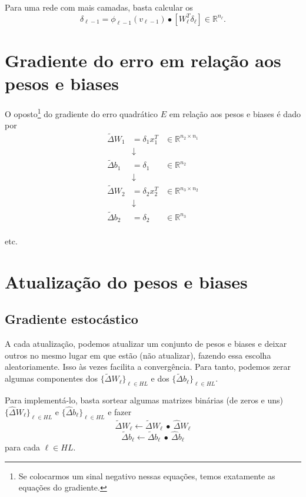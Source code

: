 \documentclass[12pt,a4paper]{article}
\def\RR{\mathbb{R}}
\begin{document}
Para uma rede com mais camadas, basta calcular os 
\[
\delta_{\ell-1}=\phi_{\ell-1}(v_{\ell-1}) \bullet [W_\ell ^T\delta_ \ell]\in\RR^{n_\ell}.
\]


\section{Gradiente do erro em relação aos pesos e biases}
O oposto\footnote{Se colocarmos um sinal negativo nessas equações, temos exatamente as equações do gradiente.} do gradiente do erro quadrático $E$ em relação aos pesos e biases é dado por
\begin{equation}
\begin{aligned}
\tilde\Delta W_1 &= \delta_1x_1^T &\in \RR^{n_2\times n_1}\\
&\downarrow\\
\tilde\Delta b_1 &= \delta_1 & \in\RR^{n_2}\\
&\downarrow\\
\tilde\Delta W_2 &= \delta_2x_2^T &\in \RR^{n_3\times n_2}\\
&\downarrow\\
\tilde\Delta b_2 &= \delta_2 & \in\RR^{n_3}\\
\end{aligned}
\end{equation}

etc.

\section{Atualização do pesos e biases}
\subsection{Gradiente estocástico}
A cada atualização, podemos atualizar um conjunto de pesos e biases e deixar outros no mesmo lugar em que estão (não atualizar), fazendo essa escolha aleatoriamente. Isso às vezes facilita a convergência. Para tanto, podemos zerar algumas componentes dos $\{\tilde\Delta W_\ell\}_{\ell\in HL}$ e dos $\{\tilde\Delta b_\ell\}_{\ell\in HL}$. 

Para implementá-lo, basta sortear algumas matrizes binárias (de zeros e uns) $\{\widehat\Delta W_\ell\}_{\ell\in HL}$ e $\{\widehat\Delta b_\ell\}_{\ell\in HL}$ e fazer
\[
\tilde\Delta W_\ell \gets \tilde\Delta W_\ell \ \bullet\  \widehat\Delta W_\ell
\]
\[
\tilde\Delta b_\ell \gets \tilde\Delta b_\ell \ \bullet\  \widehat\Delta b_\ell
\]
para cada ${\ell\in HL}$.
\end{document}
